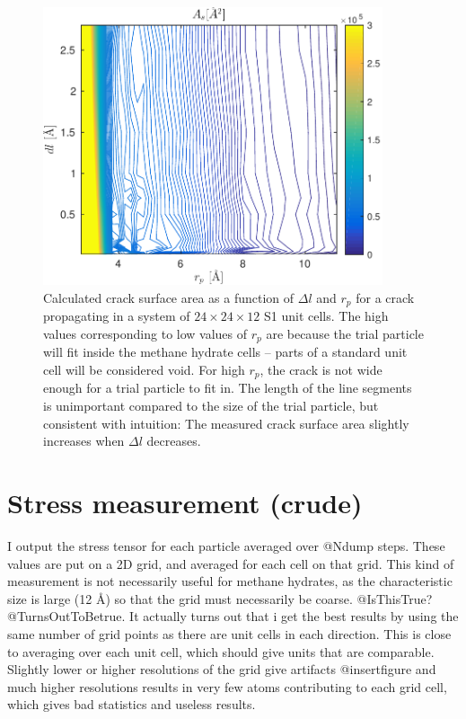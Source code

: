 \begin{figure}
\centering
\includegraphics[width=10cm]{../figures/thesis/crack_tracer_test.pdf}
\caption{Calculated crack surface area as a function of $\Delta l$ and $r_p$ for a crack propagating in a system of $24\times 24 \times 12$ S1 unit cells. The high values corresponding to low values of $r_p$ are because the trial particle will fit inside the methane hydrate cells -- parts of a standard unit cell will be considered void. For high $r_p$, the crack is not wide enough for a trial particle to fit in. The length of the line segments is unimportant compared to the size of the trial particle, but consistent with intuition: The measured crack surface area slightly increases when $\Delta l$ decreases.}
\label{fig:crack_trace_test}
\end{figure}


\section{Stress measurement (crude)}
I output the stress tensor for each particle averaged over @Ndump steps. These values are put on a 2D grid, and averaged for each cell on that grid. This kind of measurement is not necessarily useful for methane hydrates, as the characteristic size is large (12 Å) so that the grid must necessarily be coarse. @IsThisTrue?@TurnsOutToBetrue. It actually turns out that i get the best results by using the same number of grid points as there are unit cells in each direction. This is close to averaging over each unit cell, which should give units that are comparable. Slightly lower or higher resolutions of the grid give artifacts @insertfigure and much higher resolutions results in very few atoms contributing to each grid cell, which gives bad statistics and useless results. 

